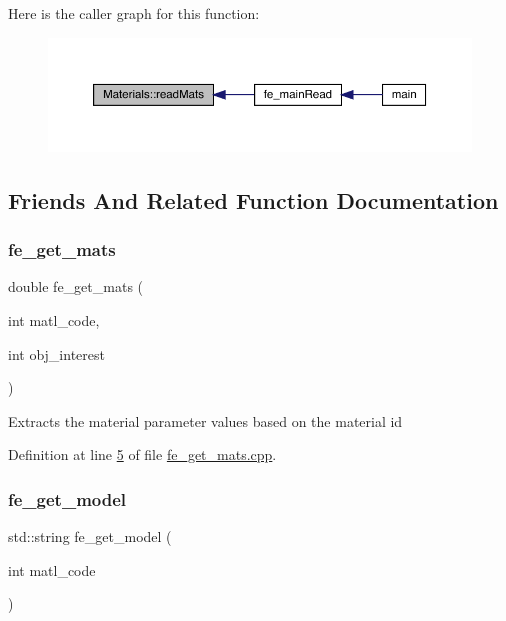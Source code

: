 Here is the caller graph for this function\+:\nopagebreak
\begin{figure}[H]
\begin{center}
\leavevmode
\includegraphics[width=350pt]{class_materials_a06e59a5742730b2292d39b7488523505_icgraph}
\end{center}
\end{figure}


\subsection{Friends And Related Function Documentation}
\mbox{\label{class_materials_af7ffbad6dfcc99fc88b130c1a7b1720a}} 
\subsubsection{\texorpdfstring{fe\+\_\+get\+\_\+mats}{fe\_get\_mats}}
{\footnotesize\ttfamily double fe\+\_\+get\+\_\+mats (\begin{DoxyParamCaption}\item[{int}]{matl\+\_\+code,  }\item[{int}]{obj\+\_\+interest }\end{DoxyParamCaption})\hspace{0.3cm}{\ttfamily [friend]}}

Extracts the material parameter values based on the material id 

Definition at line \hyperlink{fe__get__mats_8cpp_source_l00005}{5} of file \hyperlink{fe__get__mats_8cpp_source}{fe\+\_\+get\+\_\+mats.\+cpp}.

\mbox{\label{class_materials_a34d6fb85943d945b7e8600d2ef4220d0}} 
\subsubsection{\texorpdfstring{fe\+\_\+get\+\_\+model}{fe\_get\_model}}
{\footnotesize\ttfamily std\+::string fe\+\_\+get\+\_\+model (\begin{DoxyParamCaption}\item[{int}]{matl\+\_\+code }\end{DoxyParamCaption})\hspace{0.3cm}{\ttfamily [friend]}}

